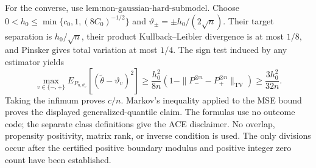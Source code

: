 For the converse, use \(\text{lem:non-gaussian-hard-submodel}\).  Choose \(0<h_0\le\min\{c_0,1,(8C_0)^{-1/2}\}\) and \(\vartheta_\pm=\pm h_0/(2\sqrt n)\).  Their target separation is \(h_0/\sqrt n\), their product Kullback--Leibler divergence is at most \(1/8\), and Pinsker gives total variation at most \(1/4\).  The sign test induced by any estimator yields
\[
 \max_{v\in\{-,+\}}E_{P_{n,\vartheta_v}}[(\widetilde\theta-\vartheta_v)^2]
 \ge\frac{h_0^2}{8n}(1-\|P_-^{\otimes n}-P_+^{\otimes n}\|_{\mathrm{TV}})
 \ge\frac{3h_0^2}{32n}.
\]
Taking the infimum proves \(c/n\).  Markov's inequality applied to the MSE bound proves the displayed generalized-quantile claim.  The formulas use no outcome code; the separate class definitions give the ACE disclaimer.  No overlap, propensity positivity, matrix rank, or inverse condition is used.  The only divisions occur after the certified positive boundary modulus and positive integer zero count have been established.